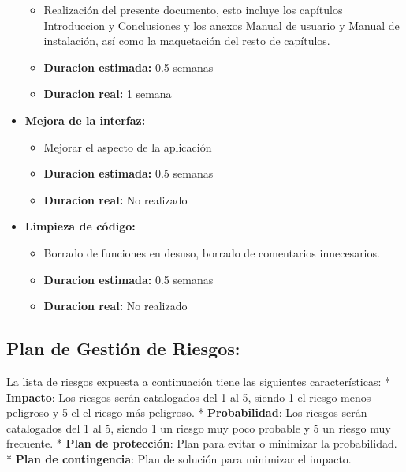\documentclass[openright,twoside,10pt]{book}
\providecommand{\tightlist}{%
  \setlength{\itemsep}{0pt}\setlength{\parskip}{0pt}}
\begin{document}
\begin{itemize}
      \begin{itemize}
      \tightlist
      \item
        Realización del presente documento, esto incluye los capítulos
        Introduccion y Conclusiones y los anexos Manual de usuario y Manual
        de instalación, así como la maquetación del resto de capítulos.
      \item
        \textbf{Duracion estimada:} 0.5 semanas
      \item
        \textbf{Duracion real:} 1 semana
      \end{itemize}
    \item
      \textbf{Mejora de la interfaz:}
    
      \begin{itemize}
      \tightlist
      \item
        Mejorar el aspecto de la aplicación
      \item
        \textbf{Duracion estimada:} 0.5 semanas
      \item
        \textbf{Duracion real:} No realizado
      \end{itemize}
    \item
      \textbf{Limpieza de código:}
    
      \begin{itemize}
      \tightlist
      \item
        Borrado de funciones en desuso, borrado de comentarios innecesarios.
      \item
        \textbf{Duracion estimada:} 0.5 semanas
      \item
        \textbf{Duracion real:} No realizado
      \end{itemize}
    \end{itemize}
    
    \subsection{Plan de Gestión de
    Riesgos:}\label{plan-de-gestiuxf3n-de-riesgos}
    
    La lista de riesgos expuesta a continuación tiene las siguientes
    características: * \textbf{Impacto}: Los riesgos serán catalogados del 1
    al 5, siendo 1 el riesgo menos peligroso y 5 el el riesgo más peligroso.
    * \textbf{Probabilidad}: Los riesgos serán catalogados del 1 al 5,
    siendo 1 un riesgo muy poco probable y 5 un riesgo muy frecuente. *
    \textbf{Plan de protección}: Plan para evitar o minimizar la
    probabilidad. * \textbf{Plan de contingencia}: Plan de solución para
    minimizar el impacto.
    
\end{document}
